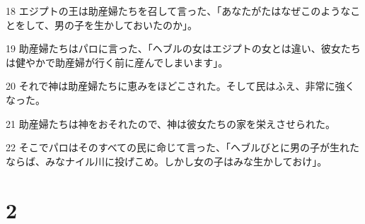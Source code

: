 \par 18 エジプトの王は助産婦たちを召して言った、「あなたがたはなぜこのようなことをして、男の子を生かしておいたのか」。
\par 19 助産婦たちはパロに言った、「ヘブルの女はエジプトの女とは違い、彼女たちは健やかで助産婦が行く前に産んでしまいます」。
\par 20 それで神は助産婦たちに恵みをほどこされた。そして民はふえ、非常に強くなった。
\par 21 助産婦たちは神をおそれたので、神は彼女たちの家を栄えさせられた。
\par 22 そこでパロはそのすべての民に命じて言った、「ヘブルびとに男の子が生れたならば、みなナイル川に投げこめ。しかし女の子はみな生かしておけ」。

\chapter{2}

